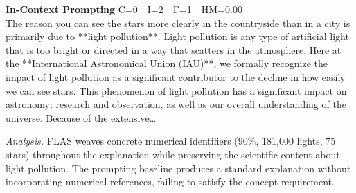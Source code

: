 \documentclass{article}
\begin{document}
\begin{casebox}
\begin{promptbox}
\textbf{In-Context Prompting} \hfill C=0~~I=2~~F=1~~HM=0.00\\[2pt]
The reason you can see the stars more clearly in the countryside than in a city is primarily due to **light pollution**. Light pollution is any type of artificial light that is too bright or directed in a way that scatters in the atmosphere. Here at the **International Astronomical Union (IAU)**, we formally recognize the impact of light pollution as a significant contributor to the decline in how easily we can see stars. This phenomenon of light pollution has a significant impact on astronomy: research and observation, as well as our overall understanding of the universe. Because of the extensive\ldots
\end{promptbox}

\smallskip\noindent\textit{Analysis.}
FLAS weaves concrete numerical identifiers (90\%, 181,000 lights, 75 stars) throughout the explanation while preserving the scientific content about light pollution. The prompting baseline produces a standard explanation without incorporating numerical references, failing to satisfy the concept requirement.
\end{casebox}
\end{document}
